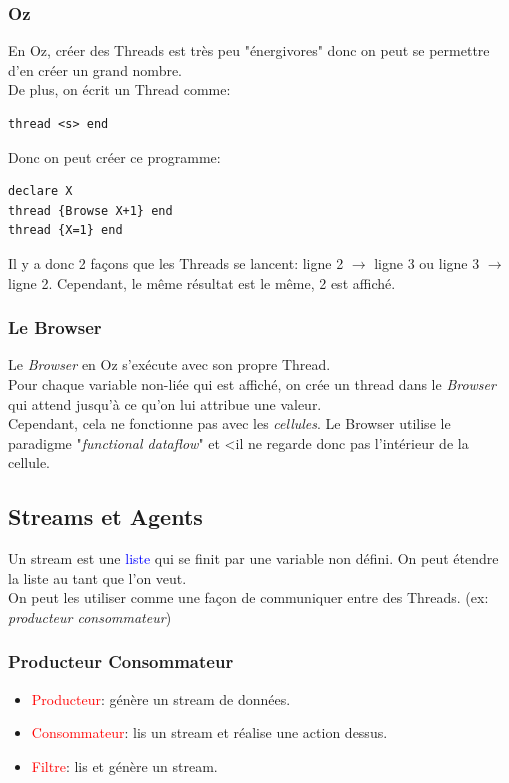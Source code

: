 \documentclass{report}
\begin{document}
\subsubsection{Oz}
En Oz, créer des Threads est très peu "énergivores" donc on peut se permettre d'en créer un grand nombre.\\
De plus, on écrit un Thread comme:
\begin{lstlisting}[escapechar=\%]
thread <s> end
\end{lstlisting}
\noindent
Donc on peut créer ce programme:
\begin{lstlisting}[escapechar=\%]
declare X
thread {Browse X+1} end
thread {X=1} end
\end{lstlisting}
Il y a donc 2 façons que les Threads se lancent: ligne 2 $\rightarrow$ ligne 3 ou ligne 3 $\rightarrow$ ligne 2. Cependant, le même résultat est le même, 2 est affiché.

\subsubsection{Le Browser}
Le \textit{Browser} en Oz s'exécute avec son propre Thread.\\
Pour chaque variable non-liée qui est affiché, on crée un thread dans le \textit{Browser} qui attend jusqu'à ce qu'on lui attribue une valeur.\\
Cependant, cela ne fonctionne pas avec les \textit{cellules}. Le Browser utilise le paradigme  "\textit{functional dataflow}" et <il ne regarde donc pas l'intérieur de la cellule.

\subsection{Streams et Agents}
Un stream est une \textcolor{blue}{liste} qui se finit par une variable non défini. On peut étendre la liste au tant que l'on veut. \\
On peut les utiliser comme une façon de communiquer entre des Threads. (ex: \textit{producteur consommateur})

\subsubsection{Producteur Consommateur}
\begin{itemize}
\item \textcolor{red}{Producteur}: génère un stream de données.
\item \textcolor{red}{Consommateur}: lis un stream et réalise une action dessus.
\item \textcolor{red}{Filtre}: lis et génère un stream.
\end{itemize} 
\end{document}
